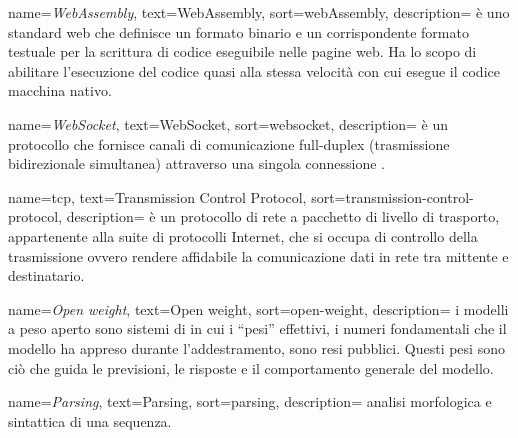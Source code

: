  {
    name=\textit{WebAssembly},
    text=WebAssembly,
    sort=webAssembly,
    description={ è uno standard web che definisce un formato binario e un corrispondente formato testuale per la scrittura di codice eseguibile nelle pagine web. Ha lo scopo di abilitare l'esecuzione del codice quasi alla stessa velocità con cui esegue il codice macchina nativo. \\
    \cite{site:webassembly-wiki}
    }
}

 {
    name=\textit{WebSocket},
    text=WebSocket,
    sort=websocket,
    description={ è un protocollo che fornisce canali di comunicazione full-duplex (trasmissione bidirezionale simultanea) attraverso una singola connessione . \\
    \cite{site:websocket-wiki}
    }
}

 {
    name=\acrshort{tcp},
    text=Transmission Control Protocol,
    sort=transmission-control-protocol,
    description={ è un protocollo di rete a pacchetto di livello di trasporto, appartenente alla suite di protocolli Internet, che si occupa di controllo della trasmissione ovvero rendere affidabile la comunicazione dati in rete tra mittente e destinatario. \\
    \cite{site:tcp-wiki}
    }
}

 {
    name=\textit{Open weight},
    text=Open weight,
    sort=open-weight,
    description={ i modelli a peso aperto sono sistemi di  in cui i “pesi” effettivi, i numeri fondamentali che il modello ha appreso durante l’addestramento, sono resi pubblici. Questi pesi sono ciò che guida le previsioni, le risposte e il comportamento generale del modello. \\
    \cite{site:open_weight-invezz}
    }
}

 {
    name=\textit{Parsing},
    text=Parsing,
    sort=parsing,
    description={ analisi morfologica e sintattica di una sequenza. \\
    \cite{site:parsing-treccani}
    }
}